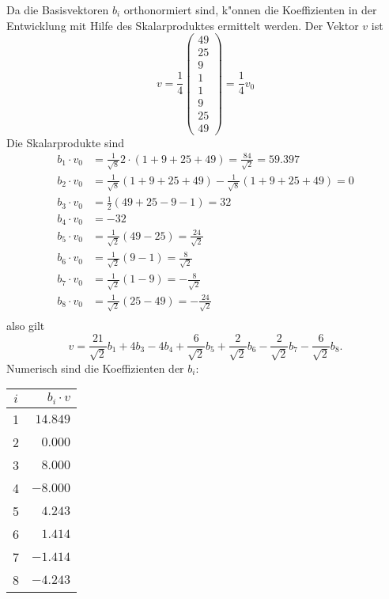 \begin{loesung}
Da die Basisvektoren $b_i$ orthonormiert sind, k"onnen die Koeffizienten
in der Entwicklung mit Hilfe des Skalarproduktes ermittelt werden. Der
Vektor $v$ ist
\[
v=\frac14\begin{pmatrix}
49\\
25\\
9\\
1\\
1\\
9\\
25\\
49
\end{pmatrix}
=\frac14v_0
\]
Die Skalarprodukte sind
\begin{align*}
b_1\cdot v_0&=\frac1{\sqrt{8}}2\cdot(1+9+25+49)=\frac{84}{\sqrt{2}}=59.397\\
b_2\cdot v_0&=\frac1{\sqrt{8}}(1+9+25+49)-\frac1{\sqrt{8}}(1+9+25+49)=0\\
b_3\cdot v_0&=\frac12(49+25-9-1)=32\\
b_4\cdot v_0&=-32\\
b_5\cdot v_0&=\frac1{\sqrt{2}}(49-25)=\frac{24}{\sqrt{2}}\\
b_6\cdot v_0&=\frac1{\sqrt{2}}(9-1)=\frac{8}{\sqrt{2}}\\
b_7\cdot v_0&=\frac1{\sqrt{2}}(1-9)=-\frac{8}{\sqrt{2}}\\
b_8\cdot v_0&=\frac1{\sqrt{2}}(25-49)=-\frac{24}{\sqrt{2}}\\
\end{align*}
also gilt
\[
v=
\frac{21}{\sqrt{2}}b_1
+
4b_3
-4b_4
+\frac{6}{\sqrt{2}}b_5
+\frac{2}{\sqrt{2}}b_6
-\frac{2}{\sqrt{2}}b_7
-\frac{6}{\sqrt{2}}b_8.
\]
Numerisch sind die Koeffizienten der $b_i$:
\begin{center}
\begin{tabular}{|c|r|}
\hline
$i$&$b_i\cdot v$\\
\hline
1&$14.849$\\
2&$ 0.000$\\
3&$ 8.000$\\
4&$-8.000$\\
5&$ 4.243$\\
6&$ 1.414$\\
7&$-1.414$\\
8&$-4.243$\\
\hline
\end{tabular}
\end{center}
\end{loesung}

